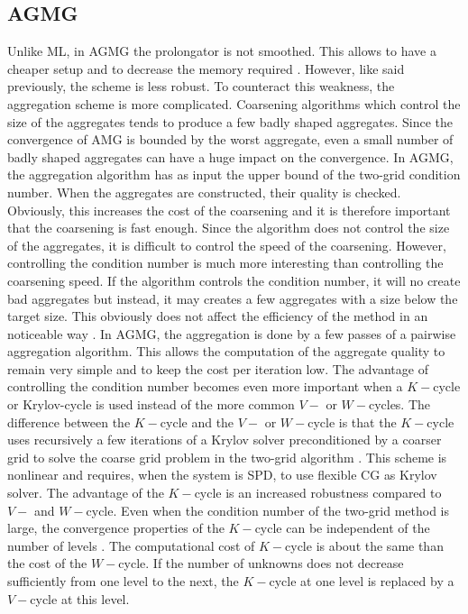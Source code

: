 \subsection{AGMG}
Unlike ML, in AGMG the prolongator is not smoothed. This allows to have a
cheaper setup and to decrease the memory required \cite{agmg2}. However, like
said previously, the scheme is less robust. To counteract this weakness, the
aggregation scheme is more complicated. Coarsening algorithms which control
the size of the aggregates tends to produce a few badly shaped aggregates.
Since the convergence of AMG is bounded by the worst aggregate, even a small 
number of badly shaped aggregates can have a huge impact on
the convergence. In AGMG, the aggregation algorithm has as input the upper
bound of the two-grid condition number. When the aggregates are constructed,
their quality is checked. Obviously, this increases the cost of the coarsening
and it is therefore important that the coarsening is fast enough. Since the 
algorithm does not control the size of the aggregates, it is difficult to 
control the speed of the coarsening. However, controlling the condition number
is much more interesting than controlling the coarsening speed. If the algorithm 
controls the condition number, it will no create bad aggregates but instead, it 
may creates a few aggregates with a size below the target size. This obviously 
does not affect the efficiency of the method in an noticeable way \cite{agmg2}. 
In AGMG, the aggregation is done by a few passes of a pairwise aggregation 
algorithm. This allows the computation of the aggregate quality to remain very 
simple and to keep the cost per iteration low. The advantage of controlling the 
condition number becomes even more important when a $K-$cycle or Krylov-cycle is 
used instead of the more common $V-$ or $W-$cycles. The difference between the 
$K-$cycle and the $V-$ or $W-$cycle is that the $K-$cycle uses recursively a 
few iterations of a Krylov solver preconditioned by a coarser grid to solve 
the coarse grid problem in the two-grid algorithm \cite{k_cycle}. This scheme 
is nonlinear and requires, when the system is SPD, to use flexible CG 
\cite{fcg,fcg_2,fcg_3,fcg_4} as Krylov solver. The advantage of the $K-$cycle is 
an increased robustness compared to $V-$ and $W-$cycle. Even when the condition 
number of the two-grid method is large, the convergence properties of the 
$K-$cycle can be independent of the number of levels \cite{k_cycle}. The 
computational cost of $K-$cycle is about the same than the cost of the 
$W-$cycle. If the number of unknowns does not decrease sufficiently from one 
level to the next, the $K-$cycle at one level is replaced by a $V-$cycle at 
this level.
